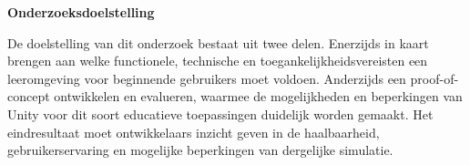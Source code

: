 \textbf{Onderzoeksdoelstelling}

De doelstelling van dit onderzoek bestaat uit twee delen. Enerzijds in kaart brengen aan welke functionele, technische en toegankelijkheidsvereisten een leeromgeving voor beginnende gebruikers moet voldoen. Anderzijds een proof-of-concept ontwikkelen en evalueren, waarmee de mogelijkheden en beperkingen van Unity voor dit soort educatieve toepassingen duidelijk worden gemaakt. Het eindresultaat moet ontwikkelaars inzicht geven in de haalbaarheid, gebruikerservaring en mogelijke beperkingen van dergelijke simulatie.




















